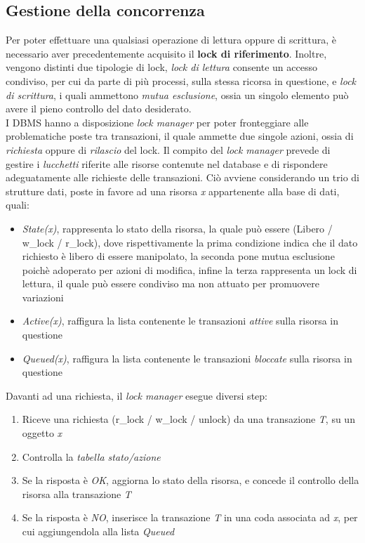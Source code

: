 \documentclass{article}
\begin{document}
\subsection*{Gestione della concorrenza}
\large
Per poter effettuare una qualsiasi operazione di lettura oppure di scrittura, è necessario aver precedentemente acquisito il \textbf{lock di riferimento}. Inoltre, vengono distinti due tipologie di lock, \textit{lock di lettura} consente un accesso condiviso, per cui da parte di più processi, sulla stessa ricorsa in questione, e \textit{lock di scrittura}, i quali ammettono \textit{mutua esclusione}, ossia un singolo elemento può avere il pieno controllo del dato desiderato.\vspace*{14pt}\\
I DBMS hanno a disposizione \textit{lock manager} per poter fronteggiare alle problematiche poste tra transazioni, il quale ammette due singole azioni, ossia di \textit{richiesta} oppure di \textit{rilascio} del lock. Il compito del \textit{lock manager} prevede di gestire i \textit{lucchetti} riferite alle risorse contenute nel database e di rispondere adeguatamente alle richieste delle transazioni. Ciò avviene considerando un trio di strutture dati, poste in favore ad una risorsa \textit{x} appartenente alla base di dati, quali:
\begin{itemize}[label={-}]
    \itemsep0em
    \item \textit{State(x)}, rappresenta lo stato della risorsa, la quale può essere (Libero / w\_lock / r\_lock), dove rispettivamente la prima condizione indica che il dato richiesto è libero di essere manipolato, la seconda pone mutua esclusione poichè adoperato per azioni di modifica, infine la terza rappresenta un lock di lettura, il quale può essere condiviso ma non attuato per promuovere variazioni
    \item \textit{Active(x)}, raffigura la lista contenente le transazioni \textit{attive} sulla risorsa in questione
    \item \textit{Queued(x)}, raffigura la lista contenente le transazioni \textit{bloccate} sulla risorsa in questione
\end{itemize}
Davanti ad una richiesta, il \textit{lock manager} esegue diversi step:
\begin{enumerate}[label={-}]
    \itemsep0em
    \item Riceve una richiesta (r\_lock / w\_lock / unlock) da una transazione \textit{T}, su un oggetto \textit{x}
    \item Controlla la \textit{tabella stato/azione}
    \item Se la risposta è \textit{OK}, aggiorna lo stato della risorsa, e concede il controllo della risorsa alla transazione \textit{T}
    \item Se la risposta è \textit{NO}, inserisce la transazione \textit{T} in una coda associata ad \textit{x}, per cui aggiungendola alla lista \textit{Queued}
\end{enumerate}
\end{document}
